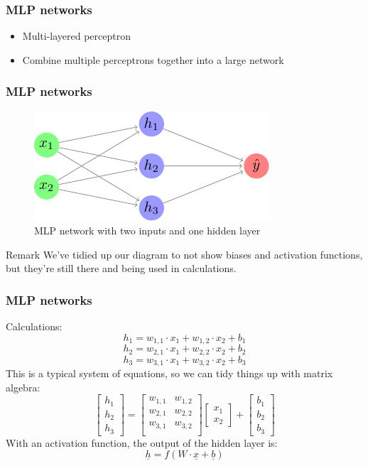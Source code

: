 \documentclass{beamer}
\begin{document}
\begin{frame}
    \frametitle{MLP networks}
    \begin{itemize}
        \item Multi-layered perceptron
        \item Combine multiple perceptrons together into a large network
    \end{itemize}
\end{frame}

\begin{frame}
    \frametitle{MLP networks}
    \begin{figure}
        \includegraphics{figures/basic-mlp/main.pdf}
        \caption{MLP network with two inputs and one hidden layer}
    \end{figure}
    \begin{block}{Remark}
        We've tidied up our diagram to not show biases and activation functions, but they're still there and being used in calculations.
    \end{block}
\end{frame}

\begin{frame}
    \frametitle{MLP networks}
    Calculations:
    \[h_{1} = w_{1, 1} \cdot x_1 + w_{1, 2} \cdot x_2 + b_{1}\]
    \[h_{2} = w_{2, 1} \cdot x_1 + w_{2, 2} \cdot x_2 + b_{2}\]
    \[h_{3} = w_{3, 1} \cdot x_1 + w_{3, 2} \cdot x_2 + b_{3}\] \pause
    This is a typical system of equations, so we can tidy things up with matrix algebra: \pause
    \[
        \begin{bmatrix}
            h_{1} \\
            h_{2} \\
            h_{3}
        \end{bmatrix}
        =
        \begin{bmatrix}
            w_{1, 1} & w_{1, 2} \\
            w_{2, 1} & w_{2, 2} \\
            w_{3, 1} & w_{3, 2} \\
        \end{bmatrix}
        \begin{bmatrix}
            x_1 \\
            x_2
        \end{bmatrix}
        +
        \begin{bmatrix}
            b_1 \\
            b_2 \\
            b_3
        \end{bmatrix}
    \] \pause
    With an activation function, the output of the hidden layer is:
    \[\underline{h} = f(W \cdot \underline{x} + \underline{b})\]
\end{frame}
\end{document}
